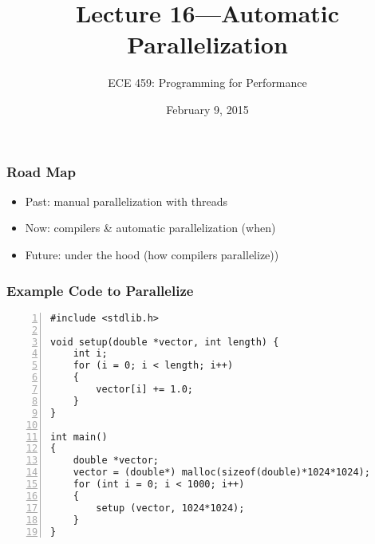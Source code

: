 \documentclass[aspectratio=43]{beamer}
\title{Lecture 16---Automatic Parallelization}
\subtitle{ECE 459: Programming for Performance}
\date{February 9, 2015}
\newenvironment{changemargin}[1]{%
  \begin{list}{}{%
    \setlength{\topsep}{0pt}%
    \setlength{\leftmargin}{#1}%
    \setlength{\rightmargin}{1em}
    \setlength{\listparindent}{\parindent}%
    \setlength{\itemindent}{\parindent}%
    \setlength{\parsep}{\parskip}%
  }%
  \item[]}{\end{list}}
\begin{document}
\begin{frame}[plain]
  \titlepage
\end{frame}

\begin{frame}
  \frametitle{Road Map}

  \begin{changemargin}{1cm}
    \begin{itemize}
    \item Past: manual parallelization with threads
    \item Now: compilers \& automatic parallelization (when)
    \item Future: under the hood (how compilers parallelize))
    \end{itemize}
  \end{changemargin}
\end{frame}

\begin{frame}[fragile]
  \frametitle{Example Code to Parallelize}

\begin{changemargin}{1.5cm}
  \begin{lstlisting}[numbers=left]
#include <stdlib.h>

void setup(double *vector, int length) {
    int i;
    for (i = 0; i < length; i++)
    {
        vector[i] += 1.0;
    }
}

int main()
{
    double *vector;
    vector = (double*) malloc(sizeof(double)*1024*1024);
    for (int i = 0; i < 1000; i++)
    {
        setup (vector, 1024*1024);
    }
}
  \end{lstlisting}
\end{changemargin}
\end{frame}
\end{document}
